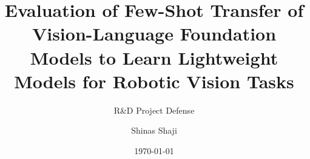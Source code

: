 


\author[Shinas Shaji]{Shinas Shaji}
\title{Evaluation of Few-Shot Transfer of Vision-Language Foundation Models to Learn Lightweight Models for Robotic Vision Tasks}
\subtitle{R\&D Project Defense}
\date{\today}
\subject{R\&D Project Defense}

\def\advisors{Prof. Dr. Sebastian Houben (Hochschule Bonn-Rhein-Sieg, Fraunhofer IAIS), \\
Santosh Thoduka M.Sc. (Fraunhofer IAIS)}



{
\begin{frame}
\titlepage
\end{frame}
}








